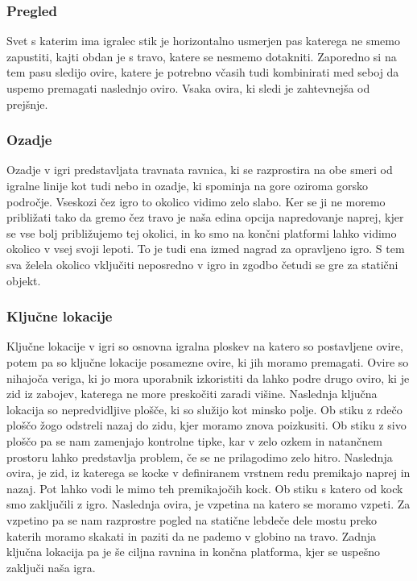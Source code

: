 \documentclass[a4paper]{article}
\begin{document}
\subsubsection{Pregled}
Svet s katerim ima igralec stik je horizontalno usmerjen pas katerega ne smemo zapustiti, kajti obdan je s travo, katere se nesmemo dotakniti. Zaporedno si na tem pasu sledijo ovire, katere je potrebno včasih tudi kombinirati med seboj da uspemo premagati naslednjo oviro. Vsaka ovira, ki sledi je zahtevnejša od prejšnje.

\subsubsection{Ozadje}
Ozadje v igri predstavljata travnata ravnica, ki se razprostira na obe smeri od igralne linije kot tudi nebo in ozadje, ki spominja na gore oziroma gorsko področje. Vseskozi čez igro to okolico vidimo zelo slabo. Ker se ji ne moremo približati tako da gremo čez travo je naša edina opcija napredovanje naprej, kjer se vse bolj približujemo tej okolici, in ko smo na končni platformi lahko vidimo okolico v vsej svoji lepoti. To je tudi ena izmed nagrad za opravljeno igro. S tem sva želela okolico vključiti neposredno v igro in zgodbo četudi se gre za statični objekt.

\subsubsection{Ključne lokacije}
Ključne lokacije v igri so osnovna igralna ploskev na katero so postavljene ovire, potem pa so ključne lokacije posamezne ovire, ki jih moramo premagati. Ovire so nihajoča veriga, ki jo mora uporabnik izkoristiti da lahko podre drugo oviro, ki je zid iz zabojev, katerega ne more preskočiti zaradi višine. Naslednja ključna lokacija so nepredvidljive plošče, ki so služijo kot minsko polje. Ob stiku z rdečo ploščo žogo odstreli nazaj do zidu, kjer moramo znova poizkusiti. Ob stiku z sivo ploščo pa se nam zamenjajo kontrolne tipke, kar v zelo ozkem in natančnem prostoru lahko predstavlja problem, če se ne prilagodimo zelo hitro. Naslednja ovira, je zid, iz katerega se kocke v definiranem vrstnem redu premikajo naprej in nazaj. Pot lahko vodi le mimo teh premikajočih kock. Ob stiku s katero od kock smo zaključili z igro. Naslednja ovira, je vzpetina na katero se moramo vzpeti. Za vzpetino pa se nam razprostre pogled na statične lebdeče dele mostu preko katerih moramo skakati in paziti da ne pademo v globino na travo. Zadnja ključna lokacija pa je še ciljna ravnina in končna platforma, kjer se uspešno zaključi naša igra.
\end{document}
